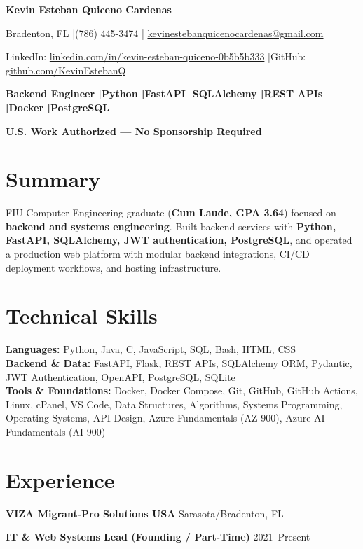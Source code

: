 \documentclass[10pt]{article}
\newcommand{\sep}{\;|\;}
\begin{document}
{\Large \textbf{Kevin Esteban Quiceno Cardenas}}

Bradenton, FL \sep (786) 445-3474 \sep
\href{mailto:kevinestebanquicenocardenas@gmail.com}{kevinestebanquicenocardenas@gmail.com}

LinkedIn: \href{https://linkedin.com/in/kevin-esteban-quiceno-0b5b5b333}{linkedin.com/in/kevin-esteban-quiceno-0b5b5b333}
\sep GitHub: \href{https://github.com/KevinEstebanQ}{github.com/KevinEstebanQ}

\textbf{Backend Engineer \sep Python \sep FastAPI \sep SQLAlchemy \sep REST APIs \sep Docker \sep PostgreSQL}

\textbf{U.S. Work Authorized — No Sponsorship Required}

\section{Summary}

FIU Computer Engineering graduate (\textbf{Cum Laude, GPA 3.64}) focused on \textbf{backend and systems engineering}. Built backend services with \textbf{Python, FastAPI, SQLAlchemy, JWT authentication, PostgreSQL}, and operated a production web platform with modular backend integrations, CI/CD deployment workflows, and hosting infrastructure.

\section{Technical Skills}

\textbf{Languages:} Python, Java, C, JavaScript, SQL, Bash, HTML, CSS \\
\textbf{Backend \& Data:} FastAPI, Flask, REST APIs, SQLAlchemy ORM, Pydantic, JWT Authentication, OpenAPI, PostgreSQL, SQLite \\
\textbf{Tools \& Foundations:} Docker, Docker Compose, Git, GitHub, GitHub Actions, Linux, cPanel, VS Code, Data Structures, Algorithms, Systems Programming, Operating Systems, API Design, Azure Fundamentals (AZ-900), Azure AI Fundamentals (AI-900)
\section{Experience}

\textbf{VIZA Migrant-Pro Solutions USA} \hfill Sarasota/Bradenton, FL

\textbf{IT \& Web Systems Lead (Founding / Part-Time)} \hfill 2021--Present
\end{document}

